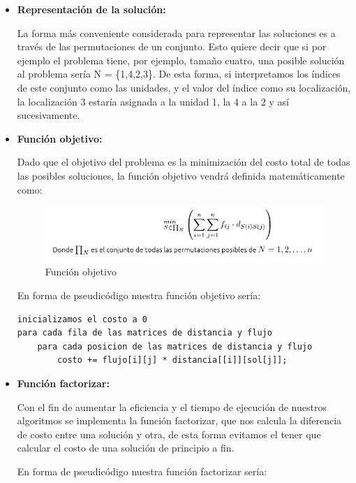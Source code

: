 \begin{itemize}
	\item \textbf{Representación de la solución: }
	
	La forma más conveniente considerada para representar las soluciones es a través de las permutaciones de un conjunto. Esto quiere decir que si por ejemplo el problema tiene, por ejemplo, tamaño cuatro, una posible solución al problema sería N = \{1,4,2,3\}. De esta forma, si interpretamos los índices de este conjunto como las unidades, y el valor del índice como su localización, la localización 3 estaría asignada a la unidad 1, la 4 a la 2 y así sucesivamente.
	
	\item \textbf{Función objetivo:}
	
	Dado que el objetivo del problema es la minimización del costo total de todas las posibles soluciones, la función objetivo vendrá definida matemáticamente como:
	
	\begin{figure}[H]
		\centering
		\includegraphics[scale=1.0]{Screenshot_2.png}
		\caption{Función objetivo}
		\label{}
	\end{figure}
	\newpage
	En forma de pseudicódigo nuestra función objetivo sería:
	
	\begin{lstlisting}[language=SH]
inicializamos el costo a 0
para cada fila de las matrices de distancia y flujo
	para cada posicion de las matrices de distancia y flujo
		costo += flujo[i][j] * distancia[[i]][sol[j]];

	\end{lstlisting}
	
	\item \textbf{Función factorizar:}
	
	Con el fin de aumentar la eficiencia y el tiempo de ejecución de nuestros algoritmos se implementa la función factorizar, que nos calcula la diferencia de costo entre una solución y otra, de esta forma evitamos el tener que calcular el costo de una solución de principio a fin.
	
	En forma de pseudicódigo nuestra función factorizar sería:
	
	\begin{lstlisting}[language=SH]
	

\end{lstlisting}
\end{itemize}
